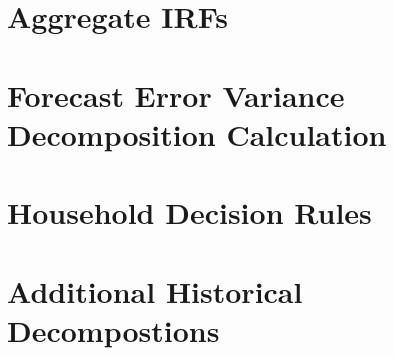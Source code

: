 \documentclass[11pt]{article}
\numberwithin{equation}{section} %
\numberwithin{figure}{section} %
\numberwithin{table}{section} %
\begin{document}
\section{Aggregate IRFs} \label{app:agg-irfs}

\FloatBarrier

\section{Forecast Error Variance Decomposition Calculation} \label{app:fevd}

\FloatBarrier

\section{Household Decision Rules} \label{app:dec-rules}

\FloatBarrier

\section{Additional Historical Decompostions} \label{app:hist-decomp}

\FloatBarrier
\end{document}
